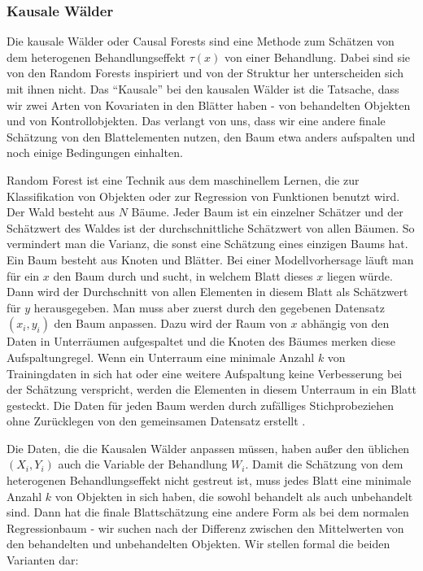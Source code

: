 \documentclass[12pt,a4paper,twoside]{scrartcl}
\numberwithin{equation}{section}
\begin{document}
\subsubsection{Kausale Wälder}\label{subsubsec:kausaleWälder}
Die kausale Wälder oder Causal Forests sind eine Methode zum Schätzen von dem heterogenen Behandlungseffekt $\tau(x)$ von einer Behandlung. Dabei sind sie von den Random Forests inspiriert und von der Struktur her unterscheiden sich mit ihnen nicht. Das \enquote{Kausale} bei den kausalen Wälder ist die Tatsache, dass wir zwei Arten von Kovariaten in den Blätter haben - von behandelten Objekten und von Kontrollobjekten. Das verlangt von uns, dass wir eine andere finale Schätzung von den Blattelementen nutzen, den Baum etwa anders aufspalten und noch einige Bedingungen einhalten\cite{wager2018estimation}. \par

\noindent
Random Forest ist eine Technik aus dem maschinellem Lernen, die zur Klassifikation von Objekten oder zur Regression von Funktionen benutzt wird. Der Wald besteht aus $N$ Bäume. Jeder Baum ist ein einzelner Schätzer und der Schätzwert des Waldes ist der durchschnittliche Schätzwert von allen Bäumen. So vermindert man die Varianz, die sonst eine Schätzung eines einzigen Baums hat. Ein Baum besteht aus Knoten und Blätter. Bei einer Modellvorhersage läuft man für ein $x$ den Baum durch und sucht, in welchem Blatt dieses $x$ liegen würde. Dann wird der Durchschnitt von allen Elementen in diesem Blatt als Schätzwert für $y$ herausgegeben. Man muss aber zuerst durch den gegebenen Datensatz $(x_i,y_i)$ den Baum anpassen. Dazu wird der Raum von $x$ abhängig von den Daten in Unterräumen aufgespaltet und die Knoten des Bäumes merken diese Aufspaltungregel. Wenn ein Unterraum eine minimale Anzahl $k$ von Trainingdaten in sich hat oder eine weitere Aufspaltung keine Verbesserung bei der Schätzung verspricht, werden die Elementen in diesem Unterraum in ein Blatt gesteckt. Die Daten für jeden Baum werden durch zufälliges Stichprobeziehen ohne Zurücklegen von den gemeinsamen Datensatz erstellt \cite{breiman2001random}.\par

\noindent
Die Daten, die die Kausalen Wälder anpassen müssen, haben außer den üblichen $(X_i,Y_i)$ auch die Variable der Behandlung $W_i$. Damit die Schätzung von dem heterogenen Behandlungseffekt nicht gestreut ist, muss jedes Blatt eine minimale Anzahl $k$ von Objekten in sich haben, die sowohl behandelt als auch unbehandelt sind. Dann hat die finale Blattschätzung eine andere Form als bei dem normalen Regressionbaum - wir suchen nach der Differenz zwischen den Mittelwerten von den behandelten und unbehandelten Objekten\cite{wager2018estimation}. Wir stellen formal die beiden Varianten dar: \par 
\end{document}
